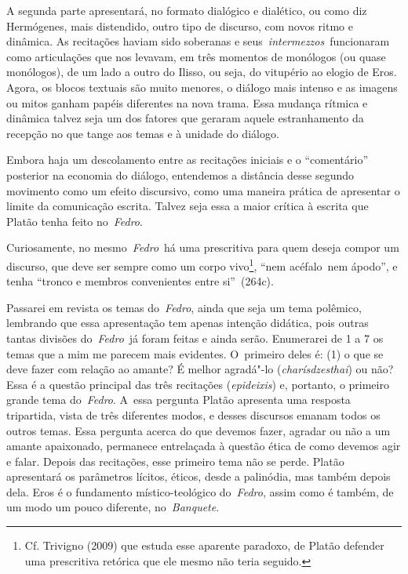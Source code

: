 A segunda parte apresentará, no formato dialógico e dialético, ou como
diz Hermógenes, mais distendido, outro tipo de discurso, com novos ritmo
e dinâmica. As recitações haviam sido soberanas e
seus~\emph{intermezzos}~funcionaram como articulações que nos levavam,
em três momentos de monólogos (ou quase monólogos), de um lado a outro
do Ilisso, ou seja, do vitupério ao elogio de Eros. Agora, os blocos
textuais são muito menores, o diálogo mais intenso e as imagens ou mitos
ganham papéis diferentes na nova trama. Essa mudança rítmica e dinâmica
talvez seja um dos fatores que geraram aquele estranhamento da recepção
no que tange aos temas e à unidade do diálogo.

Embora haja um descolamento entre as recitações iniciais e o ``comentário''
posterior na economia do diálogo, entendemos a distância desse segundo
movimento como um efeito discursivo, como uma maneira prática de
apresentar o limite da comunicação escrita. Talvez seja essa a maior
crítica à escrita que Platão tenha feito no~\emph{Fedro}.

Curiosamente, no mesmo~\emph{Fedro}~há uma prescritiva para quem deseja
compor um discurso, que deve ser sempre como um corpo vivo\footnote{Cf. Trivigno (2009) que estuda esse aparente
  paradoxo, de Platão defender uma prescritiva retórica que ele mesmo
  não teria seguido.}, ``nem
acéfalo~nem ápodo'', e tenha ``tronco e membros convenientes entre
si''~(264c).

Passarei em revista os temas do~\emph{Fedro}, ainda que seja um tema
polêmico, lembrando que essa apresentação tem apenas intenção didática,
pois outras tantas divisões do~\emph{Fedro}~já foram feitas e ainda
serão. Enumerarei de 1 a 7 os temas que a mim me parecem mais evidentes.
O~primeiro deles é: (1) o que se deve fazer com relação ao amante? É
melhor agradá"-lo (\emph{charísdzesthai}) ou não? Essa é a questão
principal das três recitações (\emph{epideixis}) e, portanto, o primeiro
grande tema do~\emph{Fedro}. A~essa pergunta Platão apresenta uma
resposta tripartida, vista de três diferentes modos, e desses discursos
emanam todos os outros temas. Essa pergunta acerca do que devemos fazer,
agradar ou não a um amante apaixonado, permanece entrelaçada à questão
ética de como devemos agir e falar. Depois das recitações, esse primeiro
tema não se perde. Platão apresentará os parâmetros lícitos, éticos,
desde a palinódia, mas também depois dela. Eros é o fundamento místico-teológico
 do~\emph{Fedro}, assim como é também, de um modo um pouco
diferente, no~\emph{Banquete}.

